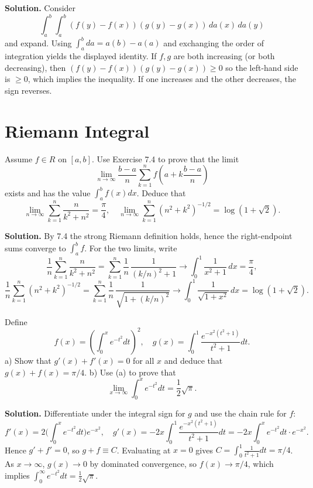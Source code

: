 \noindent\textbf{Solution.}
Consider
\[\int_a^b\int_a^b (f(y)-f(x))(g(y)-g(x))\,da(x)\,da(y)\]
and expand. Using $\int_a^b da=a(b)-a(a)$ and exchanging the order of integration yields the displayed identity. If $f,g$ are both increasing (or both decreasing), then $(f(y)-f(x))(g(y)-g(x))\ge0$ so the left-hand side is $\ge0$, which implies the inequality. If one increases and the other decreases, the sign reverses.
\medskip

\section{Riemann Integral}

\begin{problembox}
Assume $f \in R$ on $[a, b]$. Use Exercise 7.4 to prove that the limit 
\[\lim_{n \to \infty} \frac{b - a}{n} \sum_{k=1}^{n} f \left( a + k \frac{b - a}{n} \right)\]
exists and has the value $\int_a^b f(x) dx$. Deduce that 
\[\lim_{n \to \infty} \sum_{k=1}^{n} \frac{n}{k^2 + n^2} = \frac{\pi}{4}, \quad \lim_{n \to \infty} \sum_{k=1}^{n} (n^2 + k^2)^{-1/2} = \log (1 + \sqrt{2}).\]
\end{problembox}

\noindent\textbf{Solution.}
By 7.4 the strong Riemann definition holds, hence the right-endpoint sums converge to $\int_a^b f$. For the two limits, write
\[\frac{1}{n}\sum_{k=1}^n \frac{n}{k^2+n^2}=\sum_{k=1}^n \frac{1}{n}\,\frac{1}{(k/n)^2+1}\to \int_0^1 \frac{1}{x^2+1}\,dx=\frac{\pi}{4},\]
\[\frac{1}{n}\sum_{k=1}^n (n^2+k^2)^{-1/2}=\sum_{k=1}^n \frac{1}{n}\,\frac{1}{\sqrt{1+(k/n)^2}}\to \int_0^1 \frac{1}{\sqrt{1+x^2}}\,dx=\log(1+\sqrt2).
\]
\medskip

\begin{problembox}
Define 
\[f(x) = \left( \int_0^x e^{-t^2} dt \right)^2, \quad g(x) = \int_0^1 \frac{e^{-x^2(t^2+1)}}{t^2 + 1} dt.\]
a) Show that $g'(x) + f'(x) = 0$ for all $x$ and deduce that $g(x) + f(x) = \pi / 4$.
b) Use (a) to prove that 
\[\lim_{x \to \infty} \int_0^x e^{-t^2} dt = \frac{1}{2} \sqrt{\pi}.\]
\end{problembox}

\noindent\textbf{Solution.}
Differentiate under the integral sign for $g$ and use the chain rule for $f$:
\[f'(x)=2\Big(\int_0^x e^{-t^2}dt\Big)e^{-x^2},\quad g'(x)=-2x\int_0^1 \frac{e^{-x^2(t^2+1)}}{t^2+1}dt=-2x\int_0^x e^{-t^2}dt\cdot e^{-x^2}.
\]
Hence $g'+f'=0$, so $g+f\equiv C$. Evaluating at $x=0$ gives $C=\int_0^1\frac{1}{t^2+1}dt=\pi/4$. As $x\to\infty$, $g(x)\to0$ by dominated convergence, so $f(x)\to \pi/4$, which implies $\int_0^\infty e^{-t^2}dt=\tfrac12\sqrt\pi$.
\medskip

